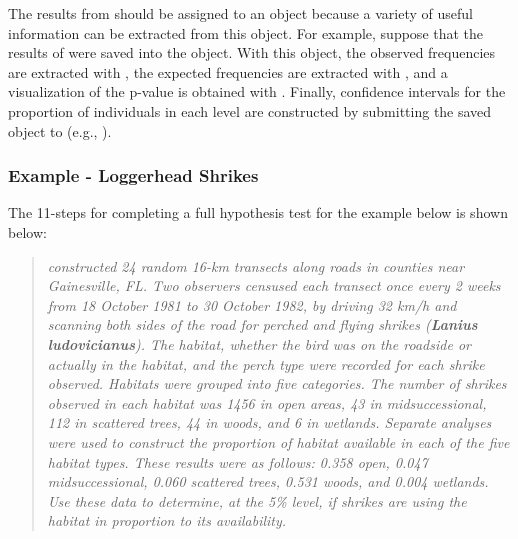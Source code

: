 \documentclass[10pt,openany]{book}\usepackage[]{graphicx}\usepackage[]{color}
\begin{document}

\vspace{-12pt}

The results from  should be assigned to an object because a variety of useful information can be extracted from this object.  For example, suppose that the results of  were saved into the  object.  With this object, the observed frequencies are extracted with , the expected frequencies are extracted with , and a visualization of the p-value is obtained with .  Finally, confidence intervals for the proportion of individuals in each level are constructed by submitting the saved object to  (e.g., ).


\subsubsection{Example - Loggerhead Shrikes}
The 11-steps  for completing a full hypothesis test for the example below is shown below:

\begin{quote}
\textsl{\cite{BohallWood1987} constructed 24 random 16-km transects along roads in counties near Gainesville, FL.  Two observers censused each transect once every 2 weeks from 18 October 1981 to 30 October 1982, by driving 32 km/h and scanning both sides of the road for perched and flying shrikes (\textbf{Lanius ludovicianus}).  The habitat, whether the bird was on the roadside or actually in the habitat, and the perch type were recorded for each shrike observed.  Habitats were grouped into five categories.  The number of shrikes observed in each habitat was 1456 in open areas, 43 in midsuccessional, 112 in scattered trees, 44 in woods, and 6 in wetlands.  Separate analyses were used to construct the proportion of habitat available in each of the five habitat types.  These results were as follows: 0.358 open, 0.047 midsuccessional, 0.060 scattered trees, 0.531 woods, and 0.004 wetlands.  Use these data to determine, at the 5\% level, if shrikes are using the habitat in proportion to its availability.}
\end{quote}
\end{document}
